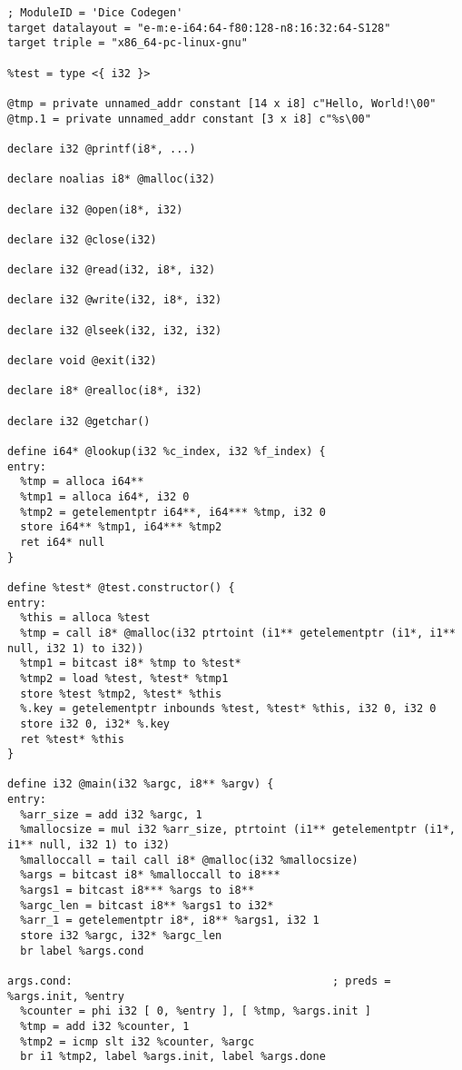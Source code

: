 \begin{verbatim}
; ModuleID = 'Dice Codegen'
target datalayout = "e-m:e-i64:64-f80:128-n8:16:32:64-S128"
target triple = "x86_64-pc-linux-gnu"

%test = type <{ i32 }>

@tmp = private unnamed_addr constant [14 x i8] c"Hello, World!\00"
@tmp.1 = private unnamed_addr constant [3 x i8] c"%s\00"

declare i32 @printf(i8*, ...)

declare noalias i8* @malloc(i32)

declare i32 @open(i8*, i32)

declare i32 @close(i32)

declare i32 @read(i32, i8*, i32)

declare i32 @write(i32, i8*, i32)

declare i32 @lseek(i32, i32, i32)

declare void @exit(i32)

declare i8* @realloc(i8*, i32)

declare i32 @getchar()

define i64* @lookup(i32 %c_index, i32 %f_index) {
entry:
  %tmp = alloca i64**
  %tmp1 = alloca i64*, i32 0
  %tmp2 = getelementptr i64**, i64*** %tmp, i32 0
  store i64** %tmp1, i64*** %tmp2
  ret i64* null
}

define %test* @test.constructor() {
entry:
  %this = alloca %test
  %tmp = call i8* @malloc(i32 ptrtoint (i1** getelementptr (i1*, i1** null, i32 1) to i32))
  %tmp1 = bitcast i8* %tmp to %test*
  %tmp2 = load %test, %test* %tmp1
  store %test %tmp2, %test* %this
  %.key = getelementptr inbounds %test, %test* %this, i32 0, i32 0
  store i32 0, i32* %.key
  ret %test* %this
}

define i32 @main(i32 %argc, i8** %argv) {
entry:
  %arr_size = add i32 %argc, 1
  %mallocsize = mul i32 %arr_size, ptrtoint (i1** getelementptr (i1*, i1** null, i32 1) to i32)
  %malloccall = tail call i8* @malloc(i32 %mallocsize)
  %args = bitcast i8* %malloccall to i8***
  %args1 = bitcast i8*** %args to i8**
  %argc_len = bitcast i8** %args1 to i32*
  %arr_1 = getelementptr i8*, i8** %args1, i32 1
  store i32 %argc, i32* %argc_len
  br label %args.cond

args.cond:                                        ; preds = %args.init, %entry
  %counter = phi i32 [ 0, %entry ], [ %tmp, %args.init ]
  %tmp = add i32 %counter, 1
  %tmp2 = icmp slt i32 %counter, %argc
  br i1 %tmp2, label %args.init, label %args.done


\end{verbatim}
